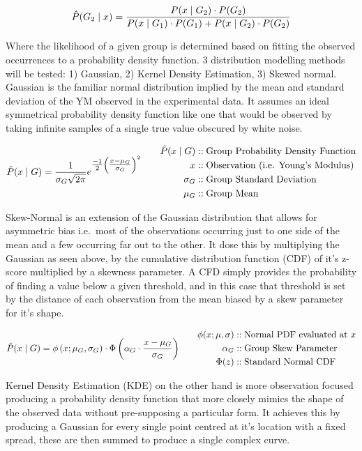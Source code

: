 \documentclass[
  paper=a4,
  ,captions=tableheading
]{scrartcl}
\begin{document}
\[\large \hat{P}(G_2 \mid x) = \frac{P(x \mid G_2) \cdot P(G_2)}{P(x \mid G_1) \cdot P(G_1) + P(x \mid G_2) \cdot P(G_2)}\]

Where the likelihood of a given group is determined based on fitting the
observed occurrences to a probability density function. 3 distribution
modelling methods will be tested: 1) Gaussian, 2) Kernel Density
Estimation, 3) Skewed normal. Gaussian is the familiar normal
distribution implied by the mean and standard deviation of the YM
observed in the experimental data. It assumes an ideal symmetrical
probability density function like one that would be observed by taking
infinite samples of a single true value obscured by white noise.

\[
{\large  
\hat{P}(x \mid G) =  
\frac{1}{\sigma_{G} \sqrt{2 \pi}}  
e^{\tfrac{-1}{2}  
\left( \tfrac{x-\mu_{G}}{\sigma_{G}}\right)^{2}}  
}
\qquad  
\begin{align}  
\hat{P}(x \mid G) &:: \text{Group Probability Density Function}\\
x           &:: \text{Observation (i.e. Young's Modulus)}\\
\sigma_{G}  &:: \text{Group Standard Deviation}\\
\mu_{G}     &:: \text{Group Mean}\\
\end{align}
\]

Skew-Normal is an extension of the Gaussian distribution that allows for
asymmetric bias i.e.~most of the observations occurring just to one side
of the mean and a few occurring far out to the other. It dose this by
multiplying the Gaussian as seen above, by the cumulative distribution
function (CDF) of it's z-score multiplied by a skewness parameter. A CFD
simply provides the probability of finding a value below a given
threshold, and in this case that threshold is set by the distance of
each observation from the mean biased by a skew parameter for it's
shape.

\[
{\large
\hat{P}(x \mid G) =  
\phi\left(x; \mu_G, \sigma_G \right)
\cdot  
\Phi\left(  
\alpha_G \cdot \frac{x - \mu_G}{\sigma_G}  
\right)
}
\qquad
\begin{align}
\phi(x; \mu, \sigma) &:: \text{Normal PDF evaluated at } x \\
\alpha_G          &:: \text{Group Skew Parameter} \\
\Phi(z)           &:: \text{Standard Normal CDF}
\end{align}
\]

Kernel Density Estimation (KDE) on the other hand is more observation
focused producing a probability density function that more closely
mimics the shape of the observed data without pre-supposing a particular
form. It achieves this by producing a Gaussian for every single point
centred at it's location with a fixed spread, these are then summed to
produce a single complex curve.
\end{document}
